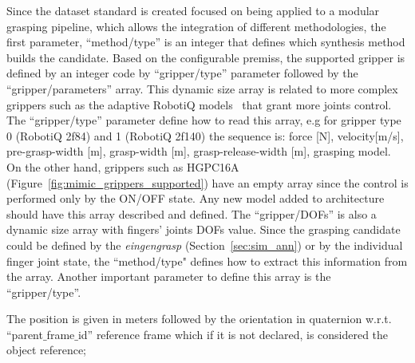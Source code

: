 Since the dataset standard is created focused on being applied to a modular grasping pipeline, which allows the integration of different methodologies, the first parameter, ``method/type'' is an integer that defines which synthesis method builds the candidate. Based on the configurable premiss, the supported gripper is defined by an integer code by ``gripper/type'' parameter followed by the ``gripper/parameters'' array. This dynamic size array is related to more complex grippers such as the adaptive RobotiQ models~\cite{robotiq_grippers} that grant more joints control. The ``gripper/type'' parameter define how to read this array, e.g for gripper type 0 (RobotiQ 2f84) and 1 (RobotiQ 2f140) the sequence is: force [N], velocity[m/s], pre-grasp-width [m], grasp-width [m], grasp-release-width [m], grasping model. On the other hand, grippers such as HGPC16A (Figure~\ref{fig:mimic_grippers_supported}) have an empty array since the control is performed only by the ON/OFF state. Any new model added to architecture should have this array described and defined. The ``gripper/DOFs'' is also a dynamic size array with fingers' joints \acp{DOF} value. Since the grasping candidate could be defined by the \textit{eingengrasp} (Section~\ref{sec:sim_ann}) or by the individual finger joint state, the ``method/type" defines how to extract this information from the array. Another important parameter to define this array is the ``gripper/type''. 

The position is given in meters followed by the orientation in quaternion w.r.t. ``parent$\_$frame$\_$id'' reference frame which if it is not declared, is considered the object reference;



